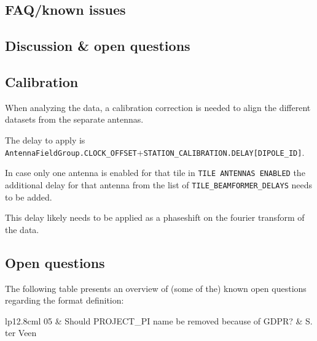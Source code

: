 \documentclass[a4paper,10pt,bibtotoc]{scrartcl}
\begin{document}
\subsection{FAQ/known issues}


\subsection{Discussion \& open questions}

\subsection{Calibration}
When analyzing the data, a calibration correction is needed to align the different datasets from the separate antennas.

The delay to apply is \verb|AntennaFieldGroup.CLOCK_OFFSET|+\verb|STATION_CALIBRATION.DELAY[DIPOLE_ID]|.

In case only one antenna is enabled for that tile in \verb|TILE ANTENNAS ENABLED| the additional delay for that antenna from the list of \verb|TILE_BEAMFORMER_DELAYS| needs to be added.

This delay likely needs to be applied as a phaseshift on the fourier transform of the data.



\subsection{Open questions}

The following table presents an overview of (some of the) known open
questions regarding the format definition:

\begin{center}
  \tablelasttail{\hline}
  \begin{supertabular}{lp{12.8cm}l}
    05 & Should PROJECT\_PI name be removed because of GDPR? & S. ter Veen \\
 \end{supertabular}
\end{center}
\end{document}
